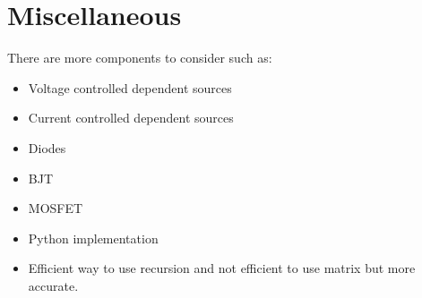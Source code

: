 \documentclass[a4paper, titlepage]{article}
\begin{document}
    \pagebreak
    \section{Miscellaneous}
    There are more components to consider such as:
    \begin{itemize}
        \item Voltage controlled dependent sources
        \item Current controlled dependent sources
        \item Diodes
        \item BJT
        \item MOSFET
        \item Python implementation
        \item Efficient way to use recursion and not efficient to use matrix but more accurate.
    \end{itemize}


    \pagebreak
    \printbibliography[title={References}]
\end{document}
